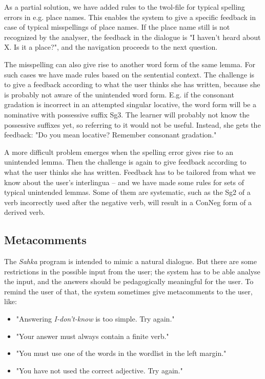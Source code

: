 \documentclass[11pt]{article}
\begin{document}
As a partial solution, we have added rules to the twol-file for typical spelling errors in e.g. place names. This enables the system to give a specific feedback in case of typical misspellings of place names. If the place name still is not recognized by the analyser, the feedback in the dialogue is "I haven't heard about X. Is it a place?", and the navigation proceeds to the next question.

The misspelling can also give rise to another word form of the same lemma. For such cases we have made rules based on the sentential context. The challenge is to give a feedback according to what the user thinks she has written, because she is probably not aware of the unintended word form. E.g. if the consonant gradation is incorrect in an attempted singular locative, the word form will be a nominative with possessive suffix Sg3. The learner will probably not know the possessive suffixes yet, so referring to it would not be useful. Instead, she gets the feedback: "Do you mean locative? Remember consonant gradation." 

A more difficult problem emerges when the spelling error gives rise to an unintended lemma. Then the challenge is again to give feedback according to what the user thinks she has written. Feedback has to be tailored from what we know about the user's interlingua -- and we have made some rules for sets of typical unintended lemmas. Some of them are systematic, such as the Sg2 of a verb incorrectly used after the negative verb, will result in a ConNeg form of a derived verb.  


\subsection{Metacomments}
The \textit{Sahka} program is intended to mimic a natural dialogue. But there are some restrictions in the possible input from the user;  the system has to be able analyse the input, and the answers should be pedagogically meaningful for the user. To remind the user of that, the system sometimes give metacomments to the user, like:
\begin{itemize}
\setlength{\itemsep}{-0.2cm}
\item "Answering \textit{I-don't-know} is too simple. Try again."
\item "Your answer must always contain a finite verb."
\item "You must use one of the words in the wordlist in the left margin."
\item "You have not used the correct adjective. Try again."
\end{itemize}
\end{document}
